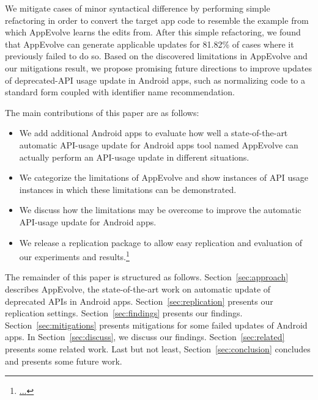 We mitigate cases of minor syntactical difference by performing simple refactoring in order to convert the target app code to resemble the example from which AppEvolve learns the edits from. After this simple refactoring, we found that AppEvolve can generate applicable updates for 81.82\% of cases where it previously failed to do so. Based on the discovered limitations in AppEvolve and our mitigations result, we propose promising future directions to improve updates of deprecated-API usage update in Android apps, such as normalizing code to a standard form coupled with identifier name recommendation.

The main contributions of this paper are as follows:
\begin{itemize}
	\item We  add additional Android apps to evaluate how well a state-of-the-art automatic API-usage update for Android apps tool named AppEvolve can actually perform an API-usage update in different situations.
	\item We categorize the limitations of AppEvolve and show instances of API usage instances in which these limitations can be demonstrated.
	\item We discuss how the limitations may be overcome to improve the automatic API-usage update for Android apps.
	\item We release a replication package to allow easy replication and evaluation of our experiments and results.\footnote{\url{...}}
\end{itemize}

The remainder of this paper is structured as follows. Section~\ref{sec:approach} describes AppEvolve, the state-of-the-art work on automatic update of deprecated APIs in Android apps. Section~\ref{sec:replication} presents our replication settings. Section~\ref{sec:findings} presents our findings. Section~\ref{sec:mitigations} presents mitigations for some failed updates of Android apps. In Section~\ref{sec:discuss}, we discuss our findings. Section~\ref{sec:related} presents some related work. Last but not least, Section~\ref{sec:conclusion} concludes and presents some future work.